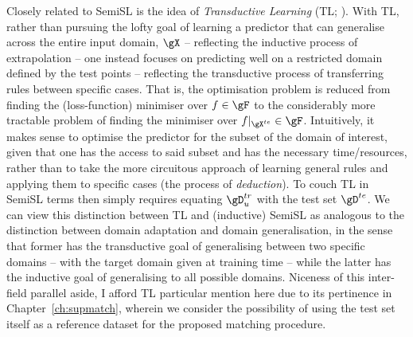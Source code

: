 %
%
Closely related to \ac{SemiSL} is the idea of \emph{Transductive Learning} (TL;
\citealp{gammerman1998learning}).
%
With TL, rather than pursuing the lofty goal of learning a predictor that can generalise across the
entire input domain, \( \gX \) -- reflecting the inductive process of extrapolation -- one instead
focuses on predicting well on a restricted domain defined by the test points -- reflecting the
transductive process of transferring rules between specific cases. 
%
That is, the optimisation problem is reduced from finding the (loss-function) minimiser over \(f
\in \gF \)  to the considerably more tractable problem of finding the minimiser over \(
f|_{\gX^{te}} \in \gF \).
%
Intuitively, it makes sense to optimise the predictor for the subset of the domain of interest,
given that one has the access to said subset and has the necessary time/resources, rather than to
take the more circuitous approach of learning general rules and applying them to specific cases
(the process of \emph{deduction}).
%
To couch TL in \ac{SemiSL} terms then simply requires equating \(\gD^{tr}_u \) with the test set
\(\gD^{te} \).
%
We can view this distinction between TL and (inductive) \ac{SemiSL} as analogous to the distinction
between domain adaptation and domain generalisation, in the sense that former has the transductive
goal of generalising between two specific domains -- with the target domain given at training time
-- while the latter has the inductive goal of generalising to all possible domains.
%
Niceness of this inter-field parallel aside, I afford TL particular mention here due to its
pertinence in Chapter~\ref{ch:supmatch}, wherein we consider the possibility of using the test set
itself as a reference dataset for the proposed matching procedure.


